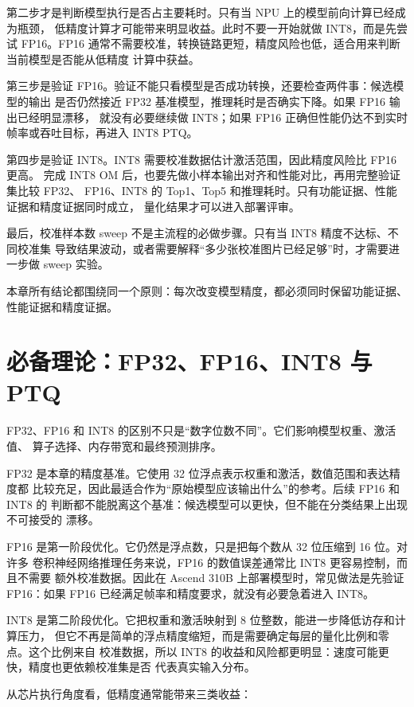 第二步才是判断模型执行是否占主要耗时。只有当 NPU
上的模型前向计算已经成为瓶颈，
低精度计算才可能带来明显收益。此时不要一开始就做 INT8，而是先尝试
FP16。FP16
通常不需要校准，转换链路更短，精度风险也低，适合用来判断当前模型是否能从低精度
计算中获益。

第三步是验证
FP16。验证不能只看模型是否成功转换，还要检查两件事：候选模型的输出
是否仍然接近 FP32 基准模型，推理耗时是否确实下降。如果 FP16
输出已经明显漂移， 就没有必要继续做 INT8；如果 FP16
正确但性能仍达不到实时帧率或吞吐目标，再进入 INT8 PTQ。

第四步是验证 INT8。INT8 需要校准数据估计激活范围，因此精度风险比 FP16
更高。 完成 INT8 OM
后，也要先做小样本输出对齐和性能对比，再用完整验证集比较 FP32、
FP16、INT8 的 Top1、Top5
和推理耗时。只有功能证据、性能证据和精度证据同时成立，
量化结果才可以进入部署评审。

最后，校准样本数 sweep 不是主流程的必做步骤。只有当 INT8
精度不达标、不同校准集
导致结果波动，或者需要解释``多少张校准图片已经足够''时，才需要进一步做
sweep 实验。

本章所有结论都围绕同一个原则：每次改变模型精度，都必须同时保留功能证据、
性能证据和精度证据。

\section{必备理论：FP32、FP16、INT8 与 PTQ}\label{src-book-chapter9-h2}

FP32、FP16 和 INT8
的区别不只是``数字位数不同''。它们影响模型权重、激活值、
算子选择、内存带宽和最终预测排序。

FP32 是本章的精度基准。它使用 32
位浮点表示权重和激活，数值范围和表达精度都
比较充足，因此最适合作为``原始模型应该输出什么''的参考。后续 FP16 和
INT8 的
判断都不能脱离这个基准：候选模型可以更快，但不能在分类结果上出现不可接受的
漂移。

FP16 是第一阶段优化。它仍然是浮点数，只是把每个数从 32 位压缩到 16
位。对许多 卷积神经网络推理任务来说，FP16 的数值误差通常比 INT8
更容易控制，而且不需要 额外校准数据。因此在 Ascend 310B
上部署模型时，常见做法是先验证 FP16：如果 FP16
已经满足帧率和精度要求，就没有必要急着进入 INT8。

INT8 是第二阶段优化。它把权重和激活映射到 8
位整数，能进一步降低访存和计算压力，
但它不再是简单的浮点精度缩短，而是需要确定每层的量化比例和零点。这个比例来自
校准数据，所以 INT8
的收益和风险都更明显：速度可能更快，精度也更依赖校准集是否
代表真实输入分布。

从芯片执行角度看，低精度通常能带来三类收益：

